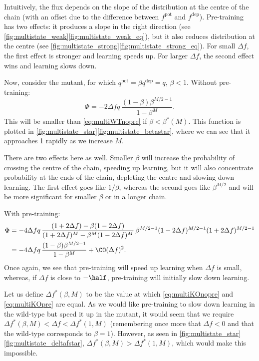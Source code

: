 \documentclass[12pt]{article}
\newcommand{\pot}{^{\text{pot}}}
\newcommand{\dep}{^{\text{dep}}}
\begin{document}
Intuitively, the flux depends on the slope of the distribution at the centre of the chain (with an offset due to the difference between $f\pot$ and $f\dep$).
Pre-training has two effects: it produces a slope in the right direction (see \autoref{fig:multistate_weak}\ref{fig:multistate_weak_eq}), but it also reduces distribution at the centre (see \autoref{fig:multistate_strong}\ref{fig:multistate_strong_eq}).
For small $\Delta f$, the first effect is stronger and learning speeds up.
For larger $\Delta f$, the second effect wins and learning slows down.

Now, consider the mutant, for which $q\pot=\beta q\dep=q$, $\beta<1$.
Without pre-training:
%
\begin{equation}\label{eq:multiKOnopre}
  \Phi = -2\Delta f q\,\frac{(1-\beta)\beta^{M/2-1}}{1-\beta^M}.
\end{equation}
%
This will be smaller than \eqref{eq:multiWTnopre} if $\beta<\beta^*(M)$.
This function is plotted in \autoref{fig:multistate_star}\ref{fig:multistate_betastar}, where we can see that it approaches 1 rapidly as we increase $M$.

There are two effects here as well.
Smaller $\beta$ will increase the probability of crossing the centre of the chain, speeding up learning, but it will also concentrate probability at the ends of the chain, depleting the centre and slowing down learning.
The first effect goes like $1/\beta$, whereas the second goes like $\beta^{M/2}$ and will be more significant for smaller $\beta$ or in a longer chain.

With pre-training:
%
\begin{equation}\label{eq:multiKOpre}
\begin{aligned}
  \Phi &= -4\Delta f q \, \frac{(1+2\Delta f) - \beta(1-2\Delta f)}
          {(1+2\Delta f)^M - \beta^M(1-2\Delta f)^M}   \,
          \beta^{M/2-1}(1-2\Delta f)^{M/2-1} (1+2\Delta f)^{M/2-1} \\
       &= -4\Delta f q\,\frac{(1-\beta)\beta^{M/2-1}}{1-\beta^M} + \CO(\Delta f)^2.
\end{aligned}
\end{equation}
%
Once again, we see that pre-training will speed up learning when $\Delta f$ is small, whereas, if $\Delta f$ is close to $-\half$, pre-training will initially slow down learning.

Let us define $\Delta f^*(\beta,M)$ to be the value at which \eqref{eq:multiKOnopre} and \eqref{eq:multiKOpre} are equal.
As we would like pre-training to slow down learning in the wild-type but speed it up in the mutant, it would seem that we require $\Delta f^*(\beta,M) < \Delta f < \Delta f^*(1,M)$ (remembering once more that $\Delta f<0$ and that the wild-type corresponds to $\beta=1$).
However, as seen in \autoref{fig:multistate_star}\ref{fig:multistate_deltafstar}, $\Delta f^*(\beta,M) > \Delta f^*(1,M)$, which would make this impossible.
\end{document}
